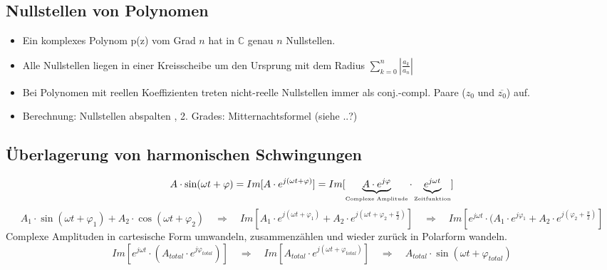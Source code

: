 \subsection{Nullstellen von Polynomen}
\begin{itemize}
  \item Ein komplexes Polynom p(z) vom Grad $n$ hat in $ \mathbb{C}$ genau $n$
  Nullstellen.
  \item Alle Nullstellen liegen in einer Kreisscheibe um den Ursprung mit dem
  Radius $ \sum\limits_{k=0}^{n} \left| \frac{a_k}{a_n} \right|$
  \item Bei Polynomen mit reellen Koeffizienten treten nicht-reelle Nullstellen
  immer als conj.-compl. Paare ($z_0$ und $\overline{z_0}$) auf.
  \item Berechnung: Nullstellen abspalten , 2. Grades: Mitternachtsformel (siehe
  ..?)
\end{itemize}

\subsection{Überlagerung von harmonischen Schwingungen}
$$A \cdot \sin(\omega t + \varphi) = Im[A \cdot e^{j(\omega t + \varphi)}] =
Im[\underbrace{A \cdot e^{j\varphi}}_{\text{\tiny{Complexe Amplitude}}}
\cdot \underbrace{e^{j\omega t}}_{\text{\tiny{Zeitfunktion}}}]$$
%
%
$$ A_1 \cdot \sin(\omega t + \varphi_1) + A_2 \cdot \cos(\omega t + \varphi_2) 
 \quad \Rightarrow \quad 
 Im[A_1 \cdot e^{j(\omega t + \varphi_1)} + A_2 \cdot e^{j (\omega t + \varphi_2
 + \frac{\pi}{2})}] \quad \Rightarrow \quad 
 Im[e^{j \omega t} \cdot  (A_1 \cdot e^{j \varphi_1} + A_2 \cdot e^{j (\varphi_2
 + \frac{\pi}{2})}]$$ 
Complexe Amplituden in cartesische Form umwandeln, zusammenzählen und wieder
zurück in Polarform wandeln.
$$ Im[e^{j \omega t} \cdot  (A_{total} \cdot e^{j \varphi_{total}})] 
 \quad \Rightarrow \quad 
 Im[A_{total} \cdot e^{j (\omega t + \varphi_{total})}] 
 \quad \Rightarrow \quad 
 A_{total} \cdot \sin(\omega t + \varphi_{total})$$

